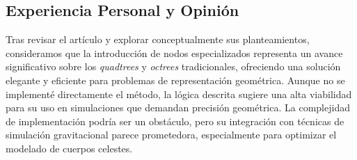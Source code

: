 \subsection{Experiencia Personal y Opinión}

Tras revisar el artículo y explorar conceptualmente sus planteamientos, consideramos que la introducción de nodos especializados representa un avance significativo sobre los \textit{quadtrees} y \textit{octrees} tradicionales, ofreciendo una solución elegante y eficiente para problemas de representación geométrica. Aunque no se implementé directamente el método, la lógica descrita sugiere una alta viabilidad para su uso en simulaciones que demandan precisión geométrica. La complejidad de implementación podría ser un obstáculo, pero su integración con técnicas de simulación gravitacional parece prometedora, especialmente para optimizar el modelado de cuerpos celestes.
